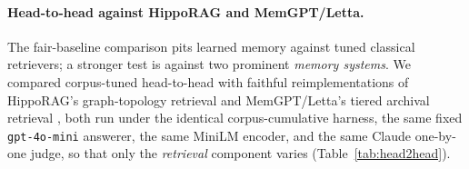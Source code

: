 \paragraph{Head-to-head against HippoRAG and MemGPT/Letta.} The fair-baseline
comparison pits learned memory against tuned classical retrievers; a stronger test
is against two prominent \emph{memory systems}. We compared \Vt{} corpus-tuned
head-to-head with faithful reimplementations of HippoRAG's graph-topology
retrieval \citep{gutierrez2024hipporag} and MemGPT/Letta's tiered archival
retrieval \citep{packer2023memgpt}, both run under the identical corpus-cumulative
harness, the same fixed \texttt{gpt-4o-mini} answerer, the same MiniLM encoder,
and the same Claude one-by-one judge, so that only the \emph{retrieval} component
varies (Table~\ref{tab:head2head}).

